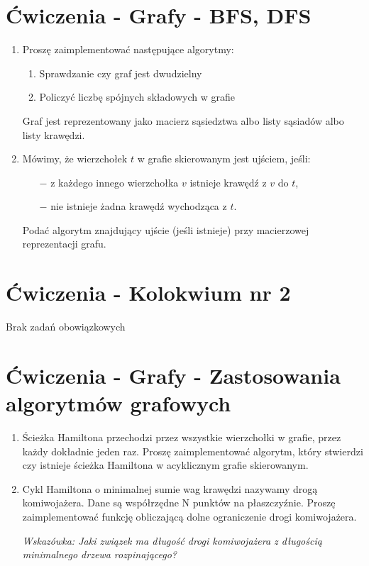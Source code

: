 \documentclass[11pt]{article}
\begin{document}
\section{Ćwiczenia - Grafy - BFS, DFS}
\begin{enumerate}
		
	\item Proszę zaimplementować następujące algorytmy:
	\begin{enumerate}
		\item Sprawdzanie czy graf jest dwudzielny
		\item Policzyć liczbę spójnych składowych w grafie
	\end{enumerate}
	Graf jest reprezentowany jako macierz sąsiedztwa albo listy sąsiadów albo listy krawędzi.
	
	\item Mówimy, że wierzchołek $t$ w grafie skierowanym jest ujściem, jeśli:	
	\begin{itemize}
		\item[$-$] z każdego innego wierzchołka $v$ istnieje krawędź z $v$ do $t$,
		\item[$-$] nie istnieje żadna krawędź wychodząca z $t$.
	\end{itemize}
	Podać algorytm znajdujący ujście (jeśli istnieje) przy macierzowej reprezentacji grafu.
	\end{enumerate}
\section{Ćwiczenia - Kolokwium nr 2}
	Brak zadań obowiązkowych
\section{Ćwiczenia - Grafy - Zastosowania algorytmów grafowych}

\begin{enumerate}
	
	\item Ścieżka Hamiltona przechodzi przez wszystkie wierzchołki w grafie, przez każdy dokładnie jeden raz. Proszę zaimplementować algorytm, który stwierdzi czy istnieje ścieżka Hamiltona w acyklicznym grafie skierowanym.
	\item Cykl Hamiltona o minimalnej sumie wag krawędzi nazywamy drogą komiwojażera. Dane są współrzędne N punktów na płaszczyźnie. Proszę zaimplementować funkcję	obliczającą dolne ograniczenie drogi komiwojażera.
	
		
{\small \textit{	Wskazówka: Jaki związek ma długość drogi komiwojażera z długością minimalnego drzewa rozpinającego?}}
\end{enumerate}
\end{document}
